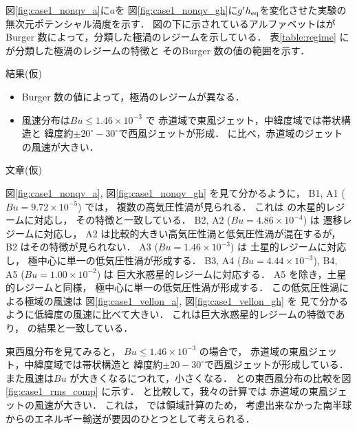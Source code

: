 \documentclass[a4j,12pt,openbib,oneside]{jreport}
\begin{document}
%
図\ref{fig:case1_nonqv_a}に$a$を
図\ref{fig:case1_nonqv_gh}に$g'h_{\rm{eq}}$を変化させた実験の
無次元ポテンシャル渦度を示す．
%
図の下に示されているアルファベットは\cite{Brueshaber2019}が
Burger 数によって，分類した極渦のレジームを示している．
表\ref{table:regime} に\cite{Brueshaber2019}が分類した極渦のレジームの特徴と
そのBurger 数の値の範囲を示す．
%

結果(仮)
\begin{itemize}
\item{Burger 数の値によって，極渦のレジームが異なる．}
\item{風速分布は$Bu \leq 1.46 \times 10^{-3} $ で
赤道域で東風ジェット，中緯度域では帯状構造と
緯度約$\pm 20^\circ - 30^\circ$で西風ジェットが形成．
\cite{Showman2007} に比べ，赤道域のジェットの風速が大きい．}
\end{itemize}
%

文章(仮) 

図\ref{fig:case1_nonqv_a}, 図\ref{fig:case1_nonqv_gh} を見て分かるように，
B1, A1 ($Bu = 9.72\times 10^{-5}$) では，
複数の高気圧性渦が見られる．
これは\cite{Brueshaber2019} の木星的レジームに対応し，
その特徴と一致している．
%
B2, A2 ($Bu = 4.86\times 10^{-4}$) は
遷移レジームに対応し，
A2 は比較的大きい高気圧性渦と低気圧性渦が混在するが，B2 はその特徴が見られない．
%
A3 ($Bu = 1.46\times 10^{-3}$) は
土星的レジームに対応し，
極中心に単一の低気圧性渦が形成する．
%
B3, A4 ($Bu = 4.44 \times 10^{-3}$), 
B4, A5 ($Bu = 1.00 \times 10^{-2}$) は
巨大氷惑星的レジームに対応する．
A5 を除き，土星的レジームと同様， 
極中心に単一の低気圧性渦が形成する．
この低気圧性渦による極域の風速は
図\ref{fig:case1_vellon_a}, 図\ref{fig:case1_vellon_gh} を
見て分かるように低緯度の風速に比べて大きい．
これは巨大氷惑星的レジームの特徴であり，
\cite{Brueshaber2019} の結果と一致している．
%

東西風分布を見てみると，
$Bu \leq 1.46 \times 10^{-3} $ の場合で，
赤道域の東風ジェット，中緯度域では帯状構造と
緯度約$\pm 20 - 30^\circ$で西風ジェットが形成している．
また風速は$Bu$ が大きくなるにつれて，小さくなる．
%
\cite{Showman2007} との東西風分布の比較を図\ref{fig:case1_rms_comp} に示す．
\cite{Showman2007} と比較して，我々の計算では
赤道域の東風ジェットの風速が大きい．
これは，\cite{Showman2007} では領域計算のため，
考慮出来なかった南半球からのエネルギー輸送が要因のひとつとして考えられる．
% 
\end{document}
